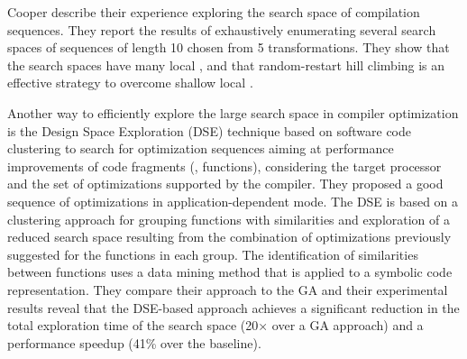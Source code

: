 Cooper \etal\cite{cooper2006exploring} describe their experience exploring the search space of compilation sequences. They report the results of exhaustively enumerating several search spaces of sequences of length 10 chosen from 5 transformations. They show that the search spaces have many local , and that random-restart hill climbing is an effective strategy to overcome shallow local .


Another way to efficiently explore the large search space in compiler optimization is the Design Space Exploration (DSE) technique based on software code clustering to search for optimization sequences aiming at performance improvements of code fragments (\eg, functions), considering the target processor and the set of optimizations supported by the compiler\cite{martins2014exploration,martins2016clustering}. They proposed a good sequence of optimizations in application-dependent mode. The DSE is based on a clustering approach for grouping functions with similarities
and exploration of a reduced search space resulting from the combination of optimizations previously suggested for the functions in each group.
The identification of similarities between functions uses a data mining method that is applied to a symbolic code representation.
They compare their approach to the GA and their experimental results reveal that the DSE-based approach achieves a significant reduction in the total exploration time of the search space (20× over a GA approach) and a performance speedup (41\% over the baseline). 




